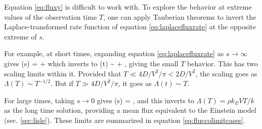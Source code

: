 \label{sec:fluxlimits}
Equation \ref{eq:fluxy} is difficult to work with. To explore the behavior at extreme values of the observation time $T$, one can apply Tauberian theorems \citep[e.g.][]{Weiss1994} to invert the Laplace-transformed rate function of equation \ref{eq:laplacefluxrate} at the opposite extreme of $s$.
	
For example, at short times, expanding equation \ref{eq:laplacefluxrate} as $s\rightarrow \infty$ gives
\be \tilde{\Lambda}(s) =  +  \ee
which inverts to
\be \Lambda(t) \sim {} + ,\ee
giving the small $T$ behavior.
This has two scaling limits within it. Provided that $T \ll 4D/V^2/\pi < 2 D/V^2$, the scaling goes as $\Lambda(T) \sim T^{-1/2}$. But if $T\gg 4D/V^2/\pi$, it goes as $\Lambda(t) \sim T$.

For large times, taking $s\rightarrow 0 $ gives
\be \tilde{\Lambda}(s) = , \ee
and this inverts to $\Lambda(T) = \rho k_E V T/k$ as the long time solution, providing a mean flux equivalent to the Einstein model (sec. \ref{sec:lisle}).
These limits are summarized in equation \ref{eq:fluccolimitcases}.
